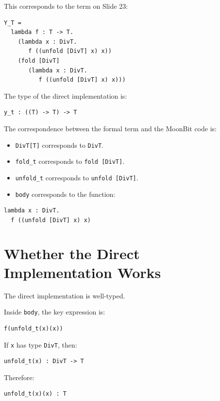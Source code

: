 \documentclass[manuscript]{acmart}
\begin{document}
This corresponds to the term on Slide 23:

\begin{lstlisting}
Y_T =
  lambda f : T -> T.
    (lambda x : DivT.
       f ((unfold [DivT] x) x))
    (fold [DivT]
       (lambda x : DivT.
          f ((unfold [DivT] x) x)))
\end{lstlisting}

The type of the direct implementation is:

\begin{lstlisting}
y_t : ((T) -> T) -> T
\end{lstlisting}

The correspondence between the formal term and the MoonBit code is:

\begin{itemize}
  \item \texttt{DivT[T]} corresponds to \texttt{DivT}.
  \item \texttt{fold\_t} corresponds to \texttt{fold [DivT]}.
  \item \texttt{unfold\_t} corresponds to \texttt{unfold [DivT]}.
  \item \texttt{body} corresponds to the function:
\end{itemize}

\begin{lstlisting}
lambda x : DivT.
  f ((unfold [DivT] x) x)
\end{lstlisting}

\section{Whether the Direct Implementation Works}

The direct implementation is well-typed.

Inside \texttt{body}, the key expression is:

\begin{lstlisting}
f(unfold_t(x)(x))
\end{lstlisting}

If \texttt{x} has type \texttt{DivT}, then:

\begin{lstlisting}
unfold_t(x) : DivT -> T
\end{lstlisting}

Therefore:

\begin{lstlisting}
unfold_t(x)(x) : T
\end{lstlisting}
\end{document}
